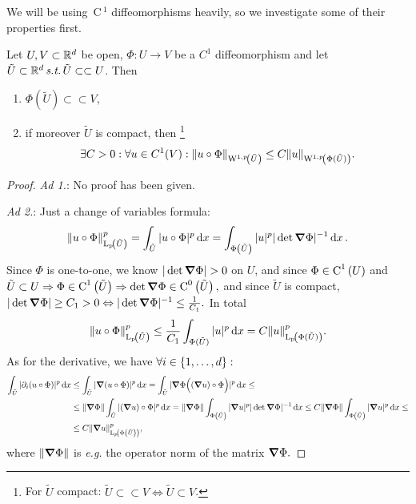 \documentclass{article}
\begin{document}
We will be using $\, \text{C} \,^1$ diffeomorphisms heavily, so we investigate some of their properties first.

\begin{lemma}
	Let $U,V \subset {\mathbb R}^d$ be open, $\Phi: U \to V$ be a $C^1$ diffeomorphism and let $\tilde{U} \subset {\mathbb R}^{d}\, \text{\textit{s.t.}} \, \tilde{U} \subset \subset U$. Then
	\begin{enumerate}
		\item $\Phi(\tilde{U}) \subset \subset V,$
		\item if moreover $\tilde{U}$ is compact, then \footnote{For $\tilde{U}$ compact: $\tilde{U} \subset \subset V \Leftrightarrow \tilde{U} \subset V$.} 
			\[
				\exists C>0: \forall u \in C^1\qty(V): \norm{u \circ \Phi}_{\WkpSet[1][p]{\tilde{U}}} \leq C \norm{u}_{\WkpSet[1][p]{\Phi(\tilde{U})}}.
			\]
	\end{enumerate}
\end{lemma}

\begin{proof}

	\textit{Ad 1.}: No proof has been given.


	\textit{Ad 2.}: Just a change of variables formula:
	\[
		\norm{u \circ \Phi}_{\LpSet{\tilde{U}}}^p = \int_{\tilde{U}}|u \circ \Phi|^p\dd{x} = \int_{\Phi\qty(\tilde{U})}|u|^p | \det \grad \Phi|^{-1}\dd{x}.
	\]
	Since $\Phi$ is one-to-one, we know $|\det \grad \Phi| >0$ on $U$, and since $\Phi \in \text{C}^{1}\!\,\left(U \right)$ and $\tilde{U} \subset U \Rightarrow \Phi \in \text{C}^{1}\!\,\left(\tilde{U} \right) \Rightarrow \det \grad \Phi \in \text{C}^{0}\!\,\left(\tilde{U} \right),$ and since $\tilde{U}$ is compact, $|\det \grad \Phi| \geq C_1 > 0 \Leftrightarrow |\det \grad \Phi|^{-1}\leq \frac{1}{C_1}.$ In total	
	\[
		\norm{u \circ \Phi}_{\LpSet{\tilde{U}}}^p \leq \frac{1}{C_1} \int_{\Phi(\tilde{U})}|u|^p\dd{x} = C\norm{u}_{\LpSet{\Phi(\tilde{U})}}^p.
	\]
	As for the derivative, we have $\forall i \in \qty{1,\dots,d}:$
	\begin{align*}
		\int_{\tilde{U}}|\partial_{i}(u \circ \Phi)|^p\dd{x} &\leq \int_{\tilde{U}}|\grad (u \circ \Phi)|^p\dd{x} = \int_{\tilde{U}}| \grad \Phi \Big(\qty(\grad u)\circ \Phi\Big)|^p\dd{x}\leq \\
									 &\leq \norm{\grad \Phi} \int_{\tilde{U}}|(\grad u) \circ \Phi|^p\dd{x} = \norm{\grad \Phi} \int_{\Phi\qty(\tilde{U})}|\grad u|^p |\det \grad \Phi|^{-1}\dd{x} \leq C\norm{\grad \Phi} \int_{\Phi\qty(\tilde{U})}|\grad u|^p\dd{x} \leq \\
										 &\leq C \norm{\grad u}_{\LpSet[p]{\Phi\qty(\tilde{U})}}^p,
	\end{align*}
	where $\norm{\grad \Phi}$ is \textit{e.g.} the operator norm of the matrix $\grad \Phi.$
\end{proof}
\end{document}
